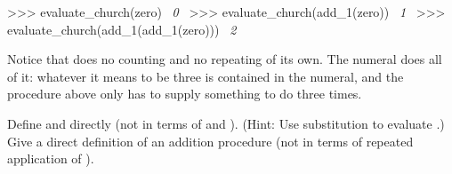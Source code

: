 \begin{exerciseGroup}
\begin{codeBlock}
>>> evaluate_church(zero)
~\textit{0}~
>>> evaluate_church(add_1(zero))
~\textit{1}~
>>> evaluate_church(add_1(add_1(zero)))
~\textit{2}~
\end{codeBlock}

\noindent
Notice that  does no counting and no repeating of its
own.  The numeral does all of it: whatever it means to be three is contained in
the numeral, and the procedure above only has to supply something to do three
times.

Define  and  directly (not in terms of  and
).  (Hint: Use substitution to evaluate .)  Give
a direct definition of an addition procedure (not in terms of repeated
application of ).
\end{exerciseGroup}

